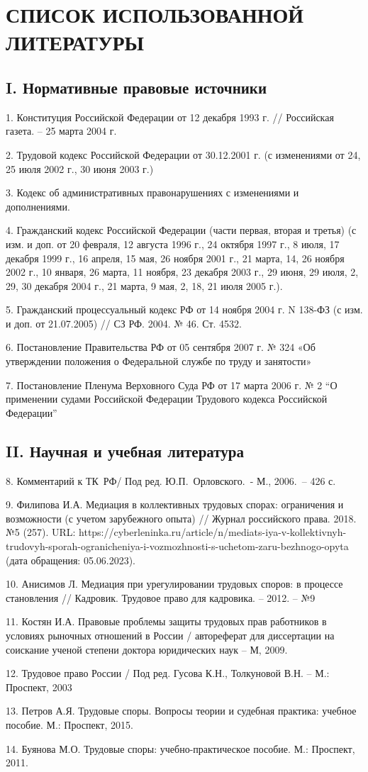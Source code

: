 \newpage
\chapter*{СПИСОК ИСПОЛЬЗОВАННОЙ ЛИТЕРАТУРЫ}
\section*{I. Нормативные правовые источники}
1.	Конституция Российской Федерации от 12 декабря 1993 г. // Российская газета. – 25 марта 2004 г.

2.	Трудовой кодекс Российской Федерации от 30.12.2001 г. (с изменениями от 24, 25 июля 2002 г., 30 июня 2003 г.)

3.	Кодекс об административных правонарушениях с изменениями и дополнениями.

4.	Гражданский кодекс Российской Федерации (части первая, вторая и третья) (с изм. и доп. от 20 февраля, 12 августа 1996 г., 24 октября 1997 г., 8 июля, 17 декабря 1999 г., 16 апреля, 15 мая, 26 ноября 2001 г., 21 марта, 14, 26 ноября 2002 г., 10 января, 26 марта, 11 ноября, 23 декабря 2003 г., 29 июня, 29 июля, 2, 29, 30 декабря 2004 г., 21 марта, 9 мая, 2, 18, 21 июля 2005 г.).

5.	Гражданский процессуальный кодекс РФ от 14 ноября 2004 г. N 138-ФЗ (с изм. и доп. от 21.07.2005) // СЗ РФ. 2004. № 46. Ст. 4532.

6.	Постановление Правительства РФ от 05 сентября 2007 г. № 324 «Об утверждении положения о Федеральной службе по труду и занятости»

7. Постановление Пленума Верховного Суда РФ от 17 марта 2006 г. № 2 \enquote{О применении судами Российской Федерации Трудового кодекса Российской Федерации}

\section*{II. Научная и учебная литература}
8.	Комментарий к ТК РФ/ Под ред. Ю.П. Орловского. - М., 2006. – 426 с.

9.	Филипова И.А. Медиация в коллективных трудовых спорах: ограничения и возможности (с учетом зарубежного опыта) // Журнал российского права. 2018. №5 (257). URL: https://cyberleninka.ru/article/n/mediats-iya-v-kollektivnyh-trudovyh-sporah-ogranicheniya-i-vozmozhnosti-s-uchetom-zaru-bezhnogo-opyta \\ (дата обращения: 05.06.2023).

10. Анисимов Л. Медиация при урегулировании трудовых споров: в процессе становления // Кадровик. Трудовое право для кадровика. -- 2012. -- №9

11. Костян И.А. Правовые проблемы защиты трудовых прав работников в условиях рыночных отношений в России / автореферат для диссертации на соискание ученой степени доктора юридических наук -- М, 2009.

12. Трудовое право России / Под ред. Гусова К.Н., Толкуновой В.Н. -- М.: Проспект, 2003

13. Петров А.Я. Трудовые споры. Вопросы теории и судебная практика: учебное пособие. М.: Проспект, 2015.

14. Буянова М.О. Трудовые споры: учебно-практическое пособие. М.: Проспект, 2011.